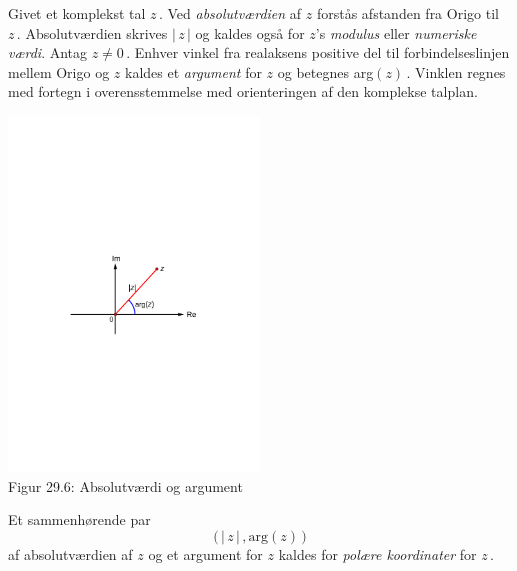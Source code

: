 \begin{definition}
Givet et komplekst tal $z\,$.\bs 
Ved \textit{absolutværdien} af $z$ forstås afstanden fra Origo til $z\,$. Absolutværdien skrives $|\,z\,|$ og kaldes også for $z$'s \textit{modulus} eller \textit{numeriske værdi}.\bs
Antag $z\neq 0\,$. Enhver vinkel fra realaksens positive del til forbindelseslinjen mellem Origo og $z$ kaldes et \textit{argument} for $z$ og betegnes arg$(z)\,$. Vinklen regnes med fortegn i overensstemmelse med orienteringen af den komplekse talplan.
\begin{center}
	\includegraphics[trim=3cm 12cm 3cm 11.5cm,width=0.5\textwidth,clip]{Geometer/polar.pdf}\\
Figur 29.6: Absolutværdi og argument
\end{center}
Et sammenhørende par $$\big(\,|\,z\,|\,,\mathrm{arg}(z)\,\big )$$ af absolutværdien af $z$ og et argument for $z$  kaldes for \textit{polære koordinater} for $z\,$.
\end{definition}

